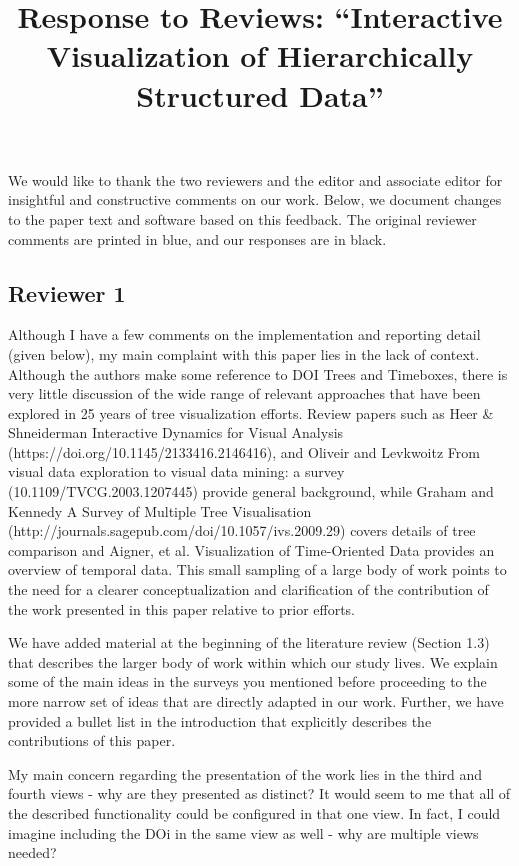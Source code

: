 \documentclass{article}
\title{Response to Reviews: ``Interactive Visualization of Hierarchically Structured Data''}
\begin{document}
\maketitle

We would like to thank the two reviewers and the editor and associate editor for
insightful and constructive comments on our work. Below, we document changes to
the paper text and software based on this feedback. The original reviewer
comments are printed in blue, and our responses are in black.

\subsection{Reviewer 1}

\color{blue}

Although I have a few comments on the implementation and reporting detail (given
below), my main complaint with this paper lies in the lack of context. Although
the authors make some reference to DOI Trees and Timeboxes, there is very little
discussion of the wide range of relevant approaches that have been explored in
25 years of tree visualization efforts. Review papers such as Heer \&
Shneiderman Interactive Dynamics for Visual Analysis
(https://doi.org/10.1145/2133416.2146416), and Oliveir and Levkwoitz From visual
data exploration to visual data mining: a survey (10.1109/TVCG.2003.1207445)
provide general background, while Graham and Kennedy A Survey of Multiple Tree
Visualisation (http://journals.sagepub.com/doi/10.1057/ivs.2009.29) covers
details of tree comparison and Aigner, et al. Visualization of Time-Oriented
Data provides an overview of temporal data. This small sampling of a large body
of work points to the need for a clearer conceptualization and clarification of
the contribution of the work presented in this paper relative to prior efforts.

\color{black}

We have added material at the beginning of the literature review (Section 1.3) that
describes the larger body of work within which our study lives. We explain some of
the main ideas in the surveys you mentioned before proceeding to the more narrow
set of ideas that are directly adapted in our work. Further, we have provided a
bullet list in the introduction that explicitly describes the contributions of
this paper.

\color{blue}

My main concern regarding the presentation of the work lies in the third and
fourth views - why are they presented as distinct? It would seem to me that all
of the described functionality could be configured in that one view. In fact, I
could imagine including the DOi in the same view as well - why are multiple
views needed?
\end{document}
